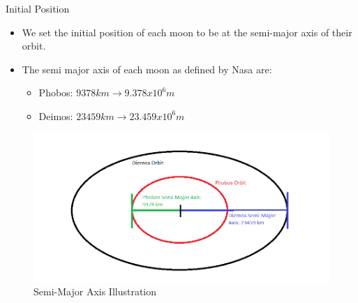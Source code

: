 \documentclass{beamer}  %
\begin{document}
\begin{frame}{Initial Position}

\begin{itemize}
\item We set the initial position of each moon to be at the semi-major axis of their orbit.
\item The semi major axis of each moon as defined by Nasa are:
\begin{itemize}
	\item Phobos: $9378km \rightarrow 9.378 x 10^6m$
	\item Deimos: $23459km \rightarrow 23.459 x 10^6m$
\end{itemize}
\end{itemize}

\begin{figure}
\label{fig:2}
\caption{Semi-Major Axis Illustration}
\includegraphics[scale=0.45]{semi-majorAxis}

\end{figure}


 \end{frame}
\end{document}

